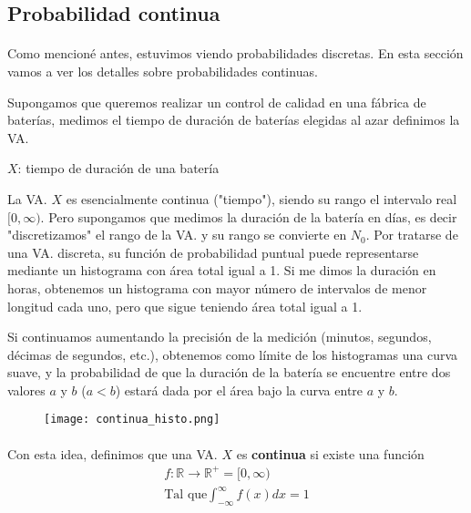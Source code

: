 \documentclass[../main.tex]{subfiles}
\begin{document}
\subsection{Probabilidad continua}
\label{seq:proba:continua}

\paragraph{} Como mencioné antes, estuvimos viendo probabilidades discretas. En esta sección vamos a ver los detalles sobre probabilidades continuas.

Supongamos que queremos realizar un control de calidad en una fábrica de baterías, medimos el tiempo de duración de baterías elegidas al azar definimos la VA.
\begin{center}
  \(X\): tiempo de duración de una batería
\end{center}

La VA. \(X\) es esencialmente continua ("tiempo"), siendo su rango el intervalo real \([0, \infty)\). Pero supongamos que medimos la duración de la batería en días, es decir "discretizamos" el rango de la VA. y su rango se convierte en \(N_{0}\). Por tratarse de una VA. discreta, su función de probabilidad puntual puede representarse mediante un histograma con área total igual a 1. Si me dimos la duración en horas, obtenemos un histograma con mayor número de intervalos de menor longitud cada uno, pero que sigue teniendo área total igual a 1.

Si continuamos aumentando la precisión de la medición (minutos, segundos, décimas de segundos, etc.), obtenemos como límite de los histogramas una curva suave, y la probabilidad de que la duración de la batería se encuentre entre dos valores \(a\) y \(b\) (\(a < b\)) estará dada por el área bajo la curva entre \(a\) y \(b\).

\begin{figure}[H]
  \centering
  \texttt{[image: continua\_histo.png]} %
\end{figure}

\paragraph{} Con esta idea, definimos que una VA. \(X\) es \textbf{continua} si existe una función
\begin{gather*}
  f : \mathbb{R} \rightarrow \mathbb{R}^{+} = [0, \infty) \\
  \text{Tal que} \int_{-\infty}^{\infty}f(x)dx = 1
\end{gather*}
\end{document}
